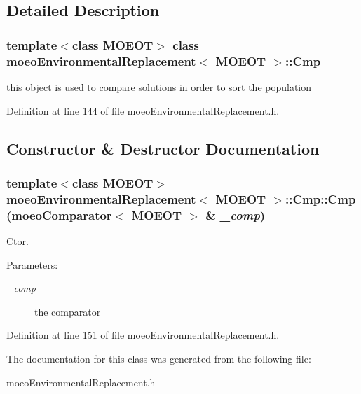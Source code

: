 \subsection{Detailed Description}
\subsubsection*{template$<$class MOEOT$>$ class moeo\-Environmental\-Replacement$<$ MOEOT $>$::Cmp}

this object is used to compare solutions in order to sort the population 



Definition at line 144 of file moeo\-Environmental\-Replacement.h.

\subsection{Constructor \& Destructor Documentation}
\subsubsection{\setlength{\rightskip}{0pt plus 5cm}template$<$class MOEOT$>$ \bf{moeo\-Environmental\-Replacement}$<$ MOEOT $>$::Cmp::Cmp (\bf{moeo\-Comparator}$<$ MOEOT $>$ \& {\em \_\-comp})\hspace{0.3cm}{\tt  [inline]}}\label{classmoeoEnvironmentalReplacement_1_1Cmp_efd55b365f306715f1a871b50d479f38}


Ctor. 

\begin{Desc}
\item[Parameters:]
\begin{description}
\item[{\em \_\-comp}]the comparator \end{description}
\end{Desc}


Definition at line 151 of file moeo\-Environmental\-Replacement.h.

The documentation for this class was generated from the following file:\begin{CompactItemize}
\item 
moeo\-Environmental\-Replacement.h\end{CompactItemize}
